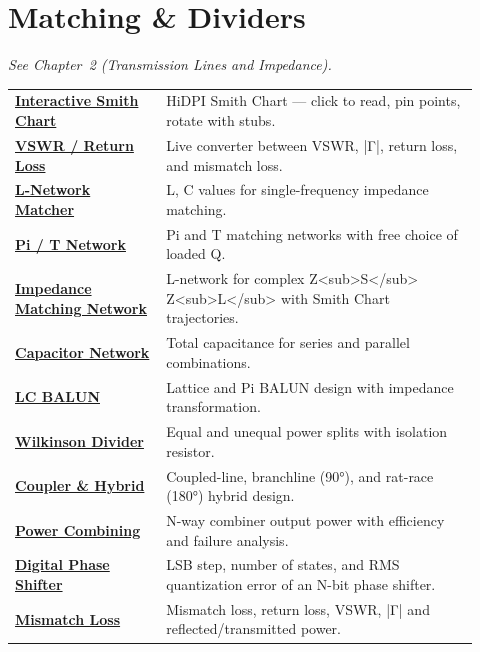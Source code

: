 \section*{Matching \& Dividers}
\noindent\emph{See Chapter~2 (Transmission Lines and Impedance).}
\begin{longtable}{>{\raggedright\arraybackslash}p{0.30\linewidth}>{\raggedright\arraybackslash}p{0.62\linewidth}}
\hline
\href{https://rftoolbox.ca/SmithChart.html}{\textbf{Interactive Smith Chart}} & HiDPI Smith Chart — click to read, pin points, rotate with stubs. \\
\href{https://rftoolbox.ca/VSWRConverter.html}{\textbf{VSWR / Return Loss}} & Live converter between VSWR, |Γ|, return loss, and mismatch loss. \\
\href{https://rftoolbox.ca/LNetwork.html}{\textbf{L-Network Matcher}} & L, C values for single-frequency impedance matching. \\
\href{https://rftoolbox.ca/PiTNetwork.html}{\textbf{Pi / T Network}} & Pi and T matching networks with free choice of loaded Q. \\
\href{https://rftoolbox.ca/ImpedanceMatchingNetwork.html}{\textbf{Impedance Matching Network}} & L-network for complex Z<sub>S</sub> Z<sub>L</sub> with Smith Chart trajectories. \\
\href{https://rftoolbox.ca/CapacitorNetwork.html}{\textbf{Capacitor Network}} & Total capacitance for series and parallel combinations. \\
\href{https://rftoolbox.ca/LCBalun.html}{\textbf{LC BALUN}} & Lattice and Pi BALUN design with impedance transformation. \\
\href{https://rftoolbox.ca/Wilkinson.html}{\textbf{Wilkinson Divider}} & Equal and unequal power splits with isolation resistor. \\
\href{https://rftoolbox.ca/Coupler.html}{\textbf{Coupler \& Hybrid}} & Coupled-line, branchline (90°), and rat-race (180°) hybrid design. \\
\href{https://rftoolbox.ca/PowerCombiner.html}{\textbf{Power Combining}} & N-way combiner output power with efficiency and failure analysis. \\
\href{https://rftoolbox.ca/PhaseShifter.html}{\textbf{Digital Phase Shifter}} & LSB step, number of states, and RMS quantization error of an N-bit phase shifter. \\
\href{https://rftoolbox.ca/MismatchLoss.html}{\textbf{Mismatch Loss}} & Mismatch loss, return loss, VSWR, |Γ| and reflected/transmitted power. \\

\end{longtable}
